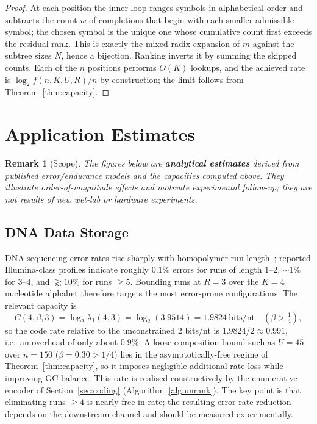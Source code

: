 \documentclass[a4paper,12pt]{article}
\newtheorem{remark}{Remark}
\begin{document}
\begin{proof}
At each position the inner loop ranges symbols in alphabetical order
and subtracts the count $w$ of completions that begin with each smaller
admissible symbol; the chosen symbol is the unique one whose
cumulative count first exceeds the residual rank.  This is exactly the
mixed-radix expansion of $m$ against the subtree sizes $N$, hence a
bijection.  Ranking inverts it by summing the skipped counts.  Each of
the $n$ positions performs $O(K)$ lookups, and the achieved rate is
$\log_2 f(n,K,U,R)/n$ by construction; the limit follows from
Theorem~\ref{thm:capacity}.
\end{proof}

\section{Application Estimates}
\label{sec:applications}

\begin{remark}[Scope]
The figures below are \textbf{analytical estimates} derived from
published error/endurance models and the capacities computed
above. They illustrate order-of-magnitude effects and motivate
experimental follow-up; they are \emph{not} results of new wet-lab or
hardware experiments.
\end{remark}

\subsection{DNA Data Storage}

DNA sequencing error rates rise sharply with homopolymer run
length~\cite{heckel2019,yazdi2017}; reported Illumina-class profiles
indicate roughly $0.1\%$ errors for runs of length $1$--$2$, $\sim1\%$
for $3$--$4$, and $\gtrsim10\%$ for runs $\ge5$.  Bounding runs at
$R=3$ over the $K=4$ nucleotide alphabet therefore targets the most
error-prone configurations.  The relevant capacity is
\begin{equation}
C(4,\beta,3)=\log_2\lambda_1(4,3)=\log_2(3.9514)=1.9824\ \text{bits/nt}
\quad(\beta>\tfrac14),
\end{equation}
so the code rate relative to the unconstrained $2$ bits/nt is
$1.9824/2\approx0.991$, i.e.\ an overhead of only about $0.9\%$.  A
loose composition bound such as $U=45$ over $n=150$
($\beta=0.30>1/4$) lies in the asymptotically-free regime of
Theorem~\ref{thm:capacity}, so it imposes negligible additional rate
loss while improving GC-balance.  This rate is realised constructively
by the enumerative encoder of Section~\ref{sec:coding}
(Algorithm~\ref{alg:unrank}).  The key point is that eliminating runs
$\ge4$ is nearly free in rate; the resulting error-rate reduction
depends on the downstream channel and should be measured
experimentally.
\end{document}
